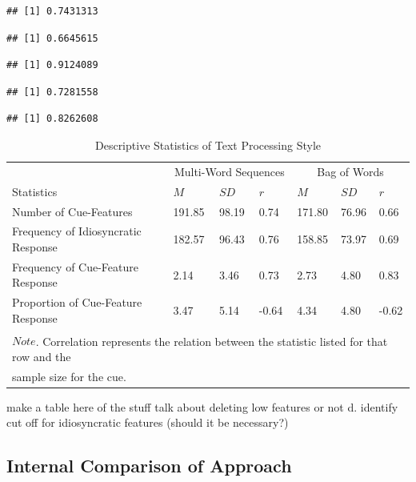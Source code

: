 \documentclass[man]{apa6}
\begin{document}
\begin{verbatim}
## [1] 0.7431313
\end{verbatim}

\begin{verbatim}
## [1] 0.6645615
\end{verbatim}

\begin{verbatim}
## [1] 0.9124089
\end{verbatim}

\begin{verbatim}
## [1] 0.7281558
\end{verbatim}

\begin{verbatim}
## [1] 0.8262608
\end{verbatim}

\begin{table}[t]

\caption{\label{tab:tab6}Descriptive Statistics of Text Processing Style}
\centering
\begin{tabular}{lllllll}
\toprule
\multicolumn{1}{c}{ } & \multicolumn{3}{c}{Multi-Word Sequences} & \multicolumn{3}{c}{Bag of Words} \\
\cmidrule(l{3pt}r{3pt}){2-4} \cmidrule(l{3pt}r{3pt}){5-7}
Statistics & $M$ & $SD$ & $r$ & $M$ & $SD$ & $r$\\
\midrule
Number of Cue-Features & 191.85 & 98.19 & 0.74 & 171.80 & 76.96 & 0.66\\
Frequency of Idiosyncratic Response & 182.57 & 96.43 & 0.76 & 158.85 & 73.97 & 0.69\\
Frequency of Cue-Feature Response & 2.14 & 3.46 & 0.73 & 2.73 & 4.80 & 0.83\\
Proportion of Cue-Feature Response & 3.47 & 5.14 & -0.64 & 4.34 & 4.80 & -0.62\\
\bottomrule
\multicolumn{7}{l}{\textsuperscript{} $Note$. Correlation represents the relation between the statistic listed for that row and the}\\
\multicolumn{7}{l}{sample size for the cue.}\\
\end{tabular}
\end{table}

make a table here of the stuff
talk about deleting low features or not
d. identify cut off for idiosyncratic features (should it be necessary?)

\hypertarget{internal-comparison-of-approach}{%
\subsection{Internal Comparison of Approach}\label{internal-comparison-of-approach}}
\end{document}
